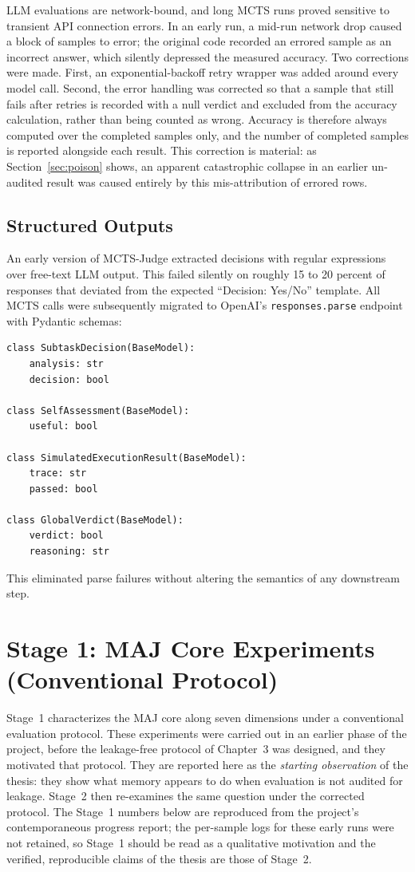 \documentclass[12pt,a4paper]{report}
\begin{document}
LLM evaluations are network-bound, and long MCTS runs proved sensitive to transient API connection errors. In an early run, a mid-run network drop caused a block of samples to error; the original code recorded an errored sample as an incorrect answer, which silently depressed the measured accuracy. Two corrections were made. First, an exponential-backoff retry wrapper was added around every model call. Second, the error handling was corrected so that a sample that still fails after retries is recorded with a null verdict and excluded from the accuracy calculation, rather than being counted as wrong. Accuracy is therefore always computed over the completed samples only, and the number of completed samples is reported alongside each result. This correction is material: as Section~\ref{sec:poison} shows, an apparent catastrophic collapse in an earlier un-audited result was caused entirely by this mis-attribution of errored rows.

\subsection{Structured Outputs}

An early version of MCTS-Judge extracted decisions with regular expressions over free-text LLM output. This failed silently on roughly 15 to 20 percent of responses that deviated from the expected ``Decision: Yes/No'' template. All MCTS calls were subsequently migrated to OpenAI's \texttt{responses.parse} endpoint with Pydantic schemas:

\begin{verbatim}
class SubtaskDecision(BaseModel):
    analysis: str
    decision: bool

class SelfAssessment(BaseModel):
    useful: bool

class SimulatedExecutionResult(BaseModel):
    trace: str
    passed: bool

class GlobalVerdict(BaseModel):
    verdict: bool
    reasoning: str
\end{verbatim}

This eliminated parse failures without altering the semantics of any downstream step.

\section{Stage 1: MAJ Core Experiments (Conventional Protocol)}

Stage~1 characterizes the MAJ core along seven dimensions under a conventional evaluation protocol. These experiments were carried out in an earlier phase of the project, before the leakage-free protocol of Chapter~3 was designed, and they motivated that protocol. They are reported here as the \textit{starting observation} of the thesis: they show what memory appears to do when evaluation is not audited for leakage. Stage~2 then re-examines the same question under the corrected protocol. The Stage~1 numbers below are reproduced from the project's contemporaneous progress report; the per-sample logs for these early runs were not retained, so Stage~1 should be read as a qualitative motivation and the verified, reproducible claims of the thesis are those of Stage~2.
\end{document}
